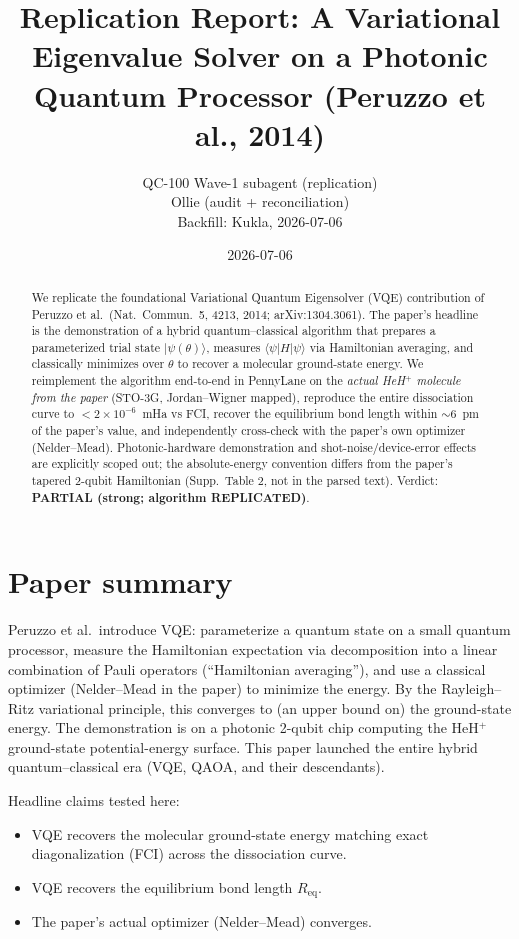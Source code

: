 \documentclass[11pt]{article}
\title{Replication Report: A Variational Eigenvalue Solver on a Photonic Quantum Processor (Peruzzo et al., 2014)}
\author{QC-100 Wave-1 subagent (replication) \\ Ollie (audit + reconciliation) \\ Backfill: Kukla, 2026-07-06}
\date{2026-07-06}
\begin{document}
\maketitle

\begin{abstract}
We replicate the foundational Variational Quantum Eigensolver (VQE) contribution of Peruzzo et al.\ (Nat.\ Commun.\ 5, 4213, 2014; arXiv:1304.3061). The paper's headline is the demonstration of a hybrid quantum--classical algorithm that prepares a parameterized trial state $|\psi(\theta)\rangle$, measures $\langle\psi|H|\psi\rangle$ via Hamiltonian averaging, and classically minimizes over $\theta$ to recover a molecular ground-state energy. We reimplement the algorithm end-to-end in PennyLane on the \emph{actual HeH$^+$ molecule from the paper} (STO-3G, Jordan--Wigner mapped), reproduce the entire dissociation curve to $<2\times10^{-6}$~mHa vs FCI, recover the equilibrium bond length within $\sim6$~pm of the paper's value, and independently cross-check with the paper's own optimizer (Nelder--Mead). Photonic-hardware demonstration and shot-noise/device-error effects are explicitly scoped out; the absolute-energy convention differs from the paper's tapered 2-qubit Hamiltonian (Supp.\ Table 2, not in the parsed text). Verdict: \textbf{PARTIAL (strong; algorithm REPLICATED)}.
\end{abstract}

\section{Paper summary}
Peruzzo et al.\ introduce VQE: parameterize a quantum state on a small quantum processor, measure the Hamiltonian expectation via decomposition into a linear combination of Pauli operators (``Hamiltonian averaging''), and use a classical optimizer (Nelder--Mead in the paper) to minimize the energy. By the Rayleigh--Ritz variational principle, this converges to (an upper bound on) the ground-state energy. The demonstration is on a photonic 2-qubit chip computing the HeH$^+$ ground-state potential-energy surface. This paper launched the entire hybrid quantum--classical era (VQE, QAOA, and their descendants).

Headline claims tested here:
\begin{itemize}
    \item VQE recovers the molecular ground-state energy matching exact diagonalization (FCI) across the dissociation curve.
    \item VQE recovers the equilibrium bond length $R_\mathrm{eq}$.
    \item The paper's actual optimizer (Nelder--Mead) converges.
\end{itemize}
\end{document}
